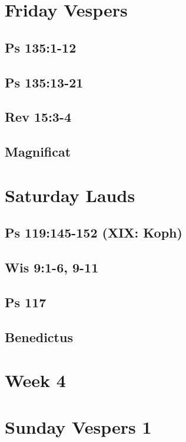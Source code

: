\section{Friday Vespers}

\subsection{Ps 135:1-12}

\subsection{Ps 135:13-21}

\subsection{Rev 15:3-4}

\subsection{Magnificat}


\section{Saturday Lauds}

\subsection{Ps 119:145-152 (XIX: Koph)}

\subsection{Wis 9:1-6, 9-11}

\subsection{Ps 117}

\subsection{Benedictus}



\section{Week 4}


\section{Sunday Vespers 1}

